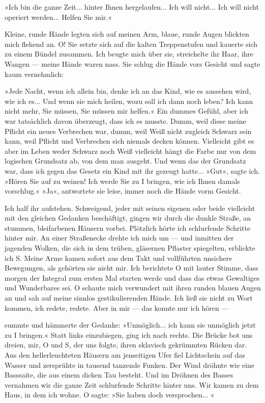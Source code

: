 »Ich bin die ganze Zeit... hinter Ihnen hergelaufen... Ich will
nicht... Ich will nicht operiert werden... Helfen Sie mir.«

Kleine, runde Hände legten sich auf meinen Arm, blaue, runde Augen
blickten mich flehend an. O! Sie setzte sich auf die kalten
Treppenstufen und kauerte sich zu einem Bündel zusammen. Ich beugte
mich über sie, streichelte ihr Haar, ihre Wangen — meine Hände
waren nass. Sie schlug die Hände vors Gesicht und sagte kaum
vernehmlich:

»Jede Nacht, wenn ich allein bin, denke ich an das Kind, wie es
aussehen wird, wie ich es... Und wenn sie mich heilen, wozu soll
ich dann noch leben? Ich kann nicht mehr, Sie müssen, Sie müssen
mir helfen.« Ein dummes Gefühl, aber ich war tatsächlich davon
überzeugt, dass ich es musste. Dumm, weil diese meine Pflicht ein
neues Verbrechen war, dumm, weil Weiß nicht zugleich Schwarz sein
kann, weil Pflicht und Verbrechen sich niemals decken können.
Vielleicht gibt es aber im Leben weder Schwarz noch Weiß vielleicht
hängt die Farbe nur von dem logischen Grundsatz ab, von dem man
ausgeht. Und wenn das der Grundsatz war, dass ich gegen das Gesetz
ein Kind mit ihr gezeugt hatte... »Gut«, sagte ich. »Hören Sie auf
zu weinen! Ich werde Sie zu I bringen, wie ich Ihnen damals
vorschlug.« »Ja«, antwortete sie leise, immer noch die Hände vorm
Gesicht.

Ich half ihr aufstehen. Schweigend, jeder mit seinen eigenen oder
beide vielleicht mit den gleichen Gedanken beschäftigt, gingen wir
durch die dunkle Straße, an stummen, bleifarbenen Häusern vorbei.
Plötzlich hörte ich schlurfende Schritte hinter mir. An einer
Straßenecke drehte ich mich um — und inmitten der jagenden Wolken,
die sich in dem trüben, gläsernen Pflaster spiegelten, erblickte
ich S. Meine Arme kamen sofort aus dem Takt und vollführten
unsichere Bewegungen, als gehörten sie nicht mir. Ich berichtete O
mit lauter Stimme, dass morgen der Integral zum ersten Mal starten
werde und dass das etwas Gewaltiges und Wunderbares sei. O schaute
mich verwundert mit ihren runden blauen Augen an und sah auf meine
sinnlos gestikulierenden Hände. Ich ließ sie nicht zu Wort kommen,
ich redete, redete. Aber in mir — das konnte nur ich hören —

summte und hämmerte der Gedanke: »Unmöglich... ich kann sie
unmöglich jetzt zu I bringen.« Statt links einzubiegen, ging ich
nach rechts. Die Brücke bot uns dreien, mir, O und S, der uns
folgte, ihren sklavisch gekrümmten Rücken dar. Aus den
hellerleuchteten Häusern am jenseitigen Ufer fiel Lichtschein auf
das Wasser und zersprühte in tausend tanzende Funken. Der Wind
dröhnte wie eine Basssaite, die aus einem dicken Tau besteht. Und
im Dröhnen des Basses vernahmen wir die ganze Zeit schlurfende
Schritte hinter uns. Wir kamen zu dem Haus, in dem ich wohne. O
sagte: »Sie haben doch versprochen... «

